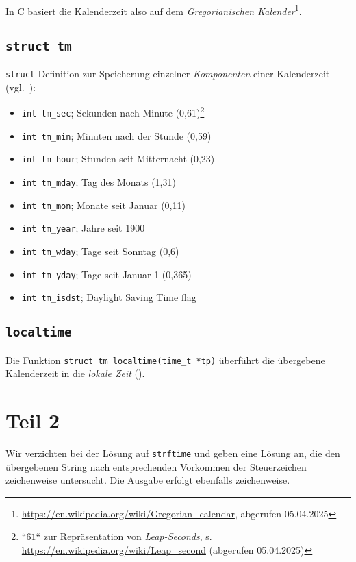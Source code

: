 \noindent
In C basiert die Kalenderzeit also auf dem \textit{Gregorianischen Kalender}\footnote{
\url{https://en.wikipedia.org/wiki/Gregorian_calendar}, abgerufen 05.04.2025
}.

\subsection*{\texttt{struct tm}}
\texttt{struct}-Definition zur Speicherung einzelner \textit{Komponenten} einer Kalenderzeit (vgl.~\cite[255]{KR88}):

\begin{itemize}
    \itemsep0.5em
    \item \texttt{int tm\_sec}; Sekunden nach Minute (0,61)\footnote{
    ``$61$`` zur Repräsentation von \textit{Leap-Seconds}, s. \url{https://en.wikipedia.org/wiki/Leap_second} (abgerufen 05.04.2025)
    }
    \item \texttt{int tm\_min}; Minuten nach der Stunde (0,59)
    \item \texttt{int tm\_hour}; Stunden seit Mitternacht (0,23)
    \item \texttt{int tm\_mday}; Tag des Monats (1,31)
    \item \texttt{int tm\_mon}; Monate seit Januar (0,11)
    \item \texttt{int tm\_year}; Jahre seit 1900
    \item \texttt{int tm\_wday}; Tage seit Sonntag (0,6)
    \item \texttt{int tm\_yday}; Tage seit Januar 1 (0,365)
    \item \texttt{int tm\_isdst}; Daylight Saving Time flag
\end{itemize}

\subsection*{\texttt{localtime}}
Die Funktion \texttt{struct tm localtime(time\_t *tp)} überführt die übergebene Kalenderzeit in die \textit{lokale Zeit} (\cite[256]{KR88}).


\section{Teil 2}

Wir verzichten bei der Lösung auf \texttt{strftime} und geben eine Lösung an, die den übergebenen String nach entsprechenden Vorkommen der Steuerzeichen zeichenweise untersucht.
Die Ausgabe erfolgt ebenfalls zeichenweise.


